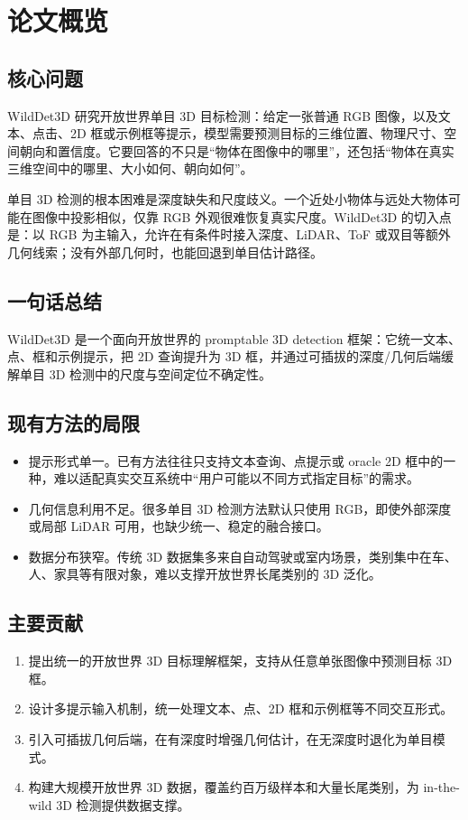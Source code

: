 \section{论文概览}

\subsection{核心问题}

WildDet3D 研究开放世界单目 3D 目标检测：给定一张普通 RGB 图像，以及文本、点击、2D 框或示例框等提示，模型需要预测目标的三维位置、物理尺寸、空间朝向和置信度。它要回答的不只是“物体在图像中的哪里”，还包括“物体在真实三维空间中的哪里、大小如何、朝向如何”。

单目 3D 检测的根本困难是深度缺失和尺度歧义。一个近处小物体与远处大物体可能在图像中投影相似，仅靠 RGB 外观很难恢复真实尺度。WildDet3D 的切入点是：以 RGB 为主输入，允许在有条件时接入深度、LiDAR、ToF 或双目等额外几何线索；没有外部几何时，也能回退到单目估计路径。

\subsection{一句话总结}

WildDet3D 是一个面向开放世界的 promptable 3D detection 框架：它统一文本、点、框和示例提示，把 2D 查询提升为 3D 框，并通过可插拔的深度/几何后端缓解单目 3D 检测中的尺度与空间定位不确定性。

\subsection{现有方法的局限}

\begin{itemize}
    \item 提示形式单一。已有方法往往只支持文本查询、点提示或 oracle 2D 框中的一种，难以适配真实交互系统中“用户可能以不同方式指定目标”的需求。
    \item 几何信息利用不足。很多单目 3D 检测方法默认只使用 RGB，即使外部深度或局部 LiDAR 可用，也缺少统一、稳定的融合接口。
    \item 数据分布狭窄。传统 3D 数据集多来自自动驾驶或室内场景，类别集中在车、人、家具等有限对象，难以支撑开放世界长尾类别的 3D 泛化。
\end{itemize}

\subsection{主要贡献}

\begin{enumerate}
    \item 提出统一的开放世界 3D 目标理解框架，支持从任意单张图像中预测目标 3D 框。
    \item 设计多提示输入机制，统一处理文本、点、2D 框和示例框等不同交互形式。
    \item 引入可插拔几何后端，在有深度时增强几何估计，在无深度时退化为单目模式。
    \item 构建大规模开放世界 3D 数据，覆盖约百万级样本和大量长尾类别，为 in-the-wild 3D 检测提供数据支撑。
\end{enumerate}
